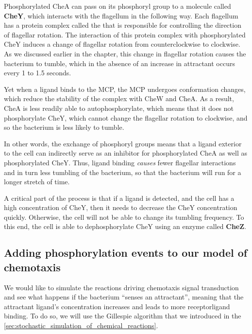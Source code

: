 Phosphorylated CheA can pass on its phosphoryl group to a molecule called \textbf{CheY}, which interacts with the flagellum in the following way. Each flagellum has a protein complex called the  that is responsible for controlling the direction of flagellar rotation. The interaction of this protein complex with phosphorylated CheY induces a change of flagellar rotation from counter\-clockwise to clockwise. As we discussed earlier in the chapter, this change in flagellar rotation causes the bacterium to tumble, which in the absence of an increase in attractant occurs every 1 to 1.5 seconds.

Yet when a ligand binds to the MCP, the MCP undergoes conformation changes, which reduce the stability of the complex with CheW and CheA. As a result, CheA is less readily able to autophosphorylate, which means that it does not phosphorylate CheY, which cannot change the flagellar rotation to clockwise, and so the bacterium is less likely to tumble.

In other words, the exchange of phosphoryl groups means that a ligand exterior to the cell can indirectly serve as an inhibitor for phosphorylated CheA as well as phosphorylated CheY. Thus, ligand binding \textit{causes} fewer flagellar interactions and in turn less tumbling of the bacterium, so that the bacterium will run for a longer stretch of time.

A critical part of the process is that if a ligand is detected, and the cell has a high concentration of CheY, then it needs to decrease the CheY concentration quickly. Otherwise, the cell will not be able to change its tumbling frequency. To this end, the cell is able to dephosphorylate CheY using an enzyme called \textbf{CheZ}.


\FloatBarrier
{}
{}
\subsection{Adding phosphorylation events to our model of chemotaxis}


We would like to simulate the reactions driving chemotaxis signal transduction and see what happens if the bacterium ``senses an attractant'', meaning that the attractant ligand's concentration increases and leads to more receptor\-ligand binding. To do so, we will use the Gillespie algorithm that we introduced in the \autoref{sec:stochastic_simulation_of_chemical_reactions}.

